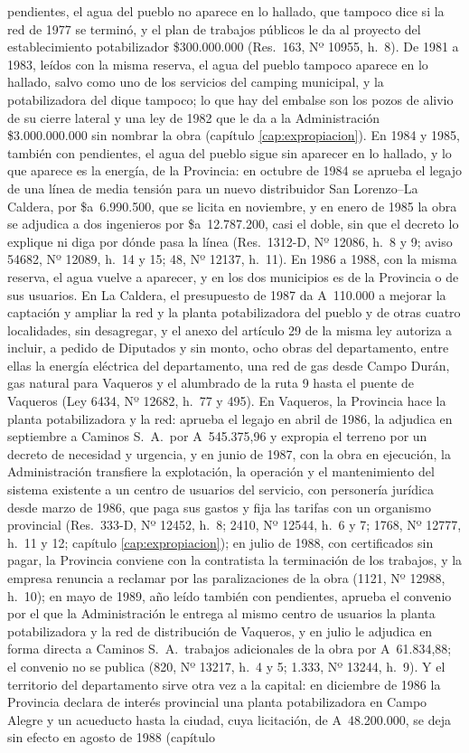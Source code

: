 pendientes, el agua del pueblo no aparece en lo hallado, que tampoco dice si la red de 1977 se terminó, y el plan de trabajos públicos le da al proyecto del establecimiento potabilizador \$300.000.000 (Res.\ 163, Nº 10955, h.\ 8). De 1981 a 1983, leídos con la misma reserva, el agua del pueblo tampoco aparece en lo hallado, salvo como uno de los servicios del camping municipal, y la potabilizadora del dique tampoco; lo que hay del embalse son los pozos de alivio de su cierre lateral y una ley de 1982 que le da a la Administración \$3.000.000.000 sin nombrar la obra (capítulo \ref{cap:expropiacion}). En 1984 y 1985, también con pendientes, el agua del pueblo sigue sin aparecer en lo hallado, y lo que aparece es la energía, de la Provincia: en octubre de 1984 se aprueba el legajo de una línea de media tensión para un nuevo distribuidor San Lorenzo--La Caldera, por \$a~6.990.500, que se licita en noviembre, y en enero de 1985 la obra se adjudica a dos ingenieros por \$a~12.787.200, casi el doble, sin que el decreto lo explique ni diga por dónde pasa la línea (Res.\ 1312-D, Nº 12086, h.\ 8 y 9; aviso 54682, Nº 12089, h.\ 14 y 15; 48, Nº 12137, h.\ 11). En 1986 a 1988, con la misma reserva, el agua vuelve a aparecer, y en los dos municipios es de la Provincia o de sus usuarios. En La Caldera, el presupuesto de 1987 da A~110.000 a mejorar la captación y ampliar la red y la planta potabilizadora del pueblo y de otras cuatro localidades, sin desagregar, y el anexo del artículo 29 de la misma ley autoriza a incluir, a pedido de Diputados y sin monto, ocho obras del departamento, entre ellas la energía eléctrica del departamento, una red de gas desde Campo Durán, gas natural para Vaqueros y el alumbrado de la ruta 9 hasta el puente de Vaqueros (Ley 6434, Nº 12682, h.\ 77 y 495). En Vaqueros, la Provincia hace la planta potabilizadora y la red: aprueba el legajo en abril de 1986, la adjudica en septiembre a Caminos S.\ A.\ por A~545.375,96 y expropia el terreno por un decreto de necesidad y urgencia, y en junio de 1987, con la obra en ejecución, la Administración transfiere la explotación, la operación y el mantenimiento del sistema existente a un centro de usuarios del servicio, con personería jurídica desde marzo de 1986, que paga sus gastos y fija las tarifas con un organismo provincial (Res.\ 333-D, Nº 12452, h.\ 8; 2410, Nº 12544, h.\ 6 y 7; 1768, Nº 12777, h.\ 11 y 12; capítulo \ref{cap:expropiacion}); en julio de 1988, con certificados sin pagar, la Provincia conviene con la contratista la terminación de los trabajos, y la empresa renuncia a reclamar por las paralizaciones de la obra (1121, Nº 12988, h.\ 10); en mayo de 1989, año leído también con pendientes, aprueba el convenio por el que la Administración le entrega al mismo centro de usuarios la planta potabilizadora y la red de distribución de Vaqueros, y en julio le adjudica en forma directa a Caminos S.\ A.\ trabajos adicionales de la obra por A~61.834,88; el convenio no se publica (820, Nº 13217, h.\ 4 y 5; 1.333, Nº 13244, h.\ 9). Y el territorio del departamento sirve otra vez a la capital: en diciembre de 1986 la Provincia declara de interés provincial una planta potabilizadora en Campo Alegre y un acueducto hasta la ciudad, cuya licitación, de A~48.200.000, se deja sin efecto en agosto de 1988 (capítulo 